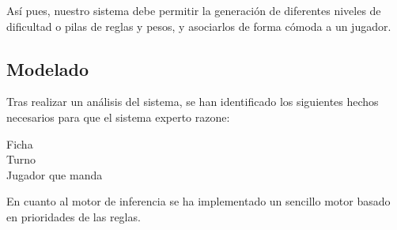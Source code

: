 Así pues, nuestro sistema debe permitir la generación de diferentes niveles de dificultad o pilas de reglas y pesos,
y asociarlos de forma cómoda a un jugador.

\subsection{Modelado}


Tras realizar un análisis del sistema, se han identificado los siguientes hechos necesarios para que el sistema experto razone:

\begin{description}
    \item[Ficha]
    \item[Turno]
    \item[Jugador que manda]
\end{description}

En cuanto al motor de inferencia se ha implementado un sencillo motor basado en prioridades de las reglas.


